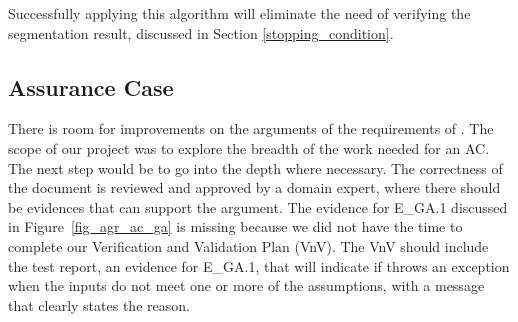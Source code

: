 Successfully applying this algorithm will eliminate the need of verifying the segmentation result, discussed in Section \ref{stopping_condition}.

\subsection{Assurance Case}

There is room for improvements on the arguments of the requirements of \progname{}. The scope of our project was to explore the breadth of the work needed for an AC. The next step would be to go into the depth where necessary. The correctness of the document is reviewed and approved by a domain expert, where there should be evidences that can support the argument. The evidence for  E\_GA.1 discussed in Figure~\ref{fig_agr_ac_ga} is missing because we did not have the time to complete our Verification and Validation Plan (VnV). The VnV should include the test report, an evidence for E\_GA.1, that will indicate if \progname{} throws an exception when the inputs do not meet one or more of the assumptions, with a message that clearly states the reason.